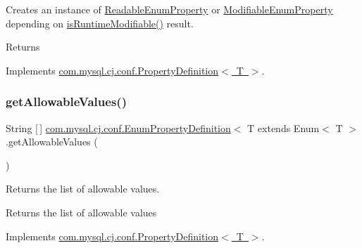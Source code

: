 Creates an instance of \mbox{\hyperlink{classcom_1_1mysql_1_1cj_1_1conf_1_1_readable_enum_property}{Readable\+Enum\+Property}} or \mbox{\hyperlink{classcom_1_1mysql_1_1cj_1_1conf_1_1_modifiable_enum_property}{Modifiable\+Enum\+Property}} depending on \mbox{\hyperlink{classcom_1_1mysql_1_1cj_1_1conf_1_1_abstract_property_definition_a6c98140b2db84ccd0ff29ce165ec9ef5}{is\+Runtime\+Modifiable()}} result.

\begin{DoxyReturn}{Returns}

\end{DoxyReturn}


Implements \mbox{\hyperlink{interfacecom_1_1mysql_1_1cj_1_1conf_1_1_property_definition_a60e957593314e41c73275bd5f4c6708e}{com.\+mysql.\+cj.\+conf.\+Property\+Definition$<$ T $>$}}.

\mbox{\label{classcom_1_1mysql_1_1cj_1_1conf_1_1_enum_property_definition_a7e2ff8f6f7baf418abdae017a6bd8136}} 
\subsubsection{\texorpdfstring{get\+Allowable\+Values()}{getAllowableValues()}}
{\footnotesize\ttfamily String \mbox{[}$\,$\mbox{]} \mbox{\hyperlink{classcom_1_1mysql_1_1cj_1_1conf_1_1_enum_property_definition}{com.\+mysql.\+cj.\+conf.\+Enum\+Property\+Definition}}$<$ T extends Enum$<$ T $>$.get\+Allowable\+Values (\begin{DoxyParamCaption}{ }\end{DoxyParamCaption})}

Returns the list of allowable values.

\begin{DoxyReturn}{Returns}
the list of allowable values 
\end{DoxyReturn}


Implements \mbox{\hyperlink{interfacecom_1_1mysql_1_1cj_1_1conf_1_1_property_definition_af0b3b3dc66dde20cb65b69eb2ec70738}{com.\+mysql.\+cj.\+conf.\+Property\+Definition$<$ T $>$}}.

\mbox{\label{classcom_1_1mysql_1_1cj_1_1conf_1_1_enum_property_definition_a00a259a5d83a0a7c6522309ff44146ba}} 
